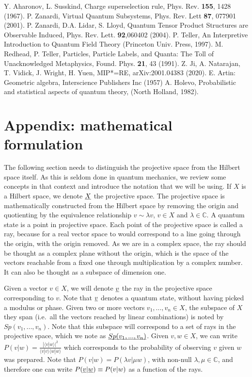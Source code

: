 \documentclass[aps,prl,amsmath,amssymb,twocolumn,nofootinbib]{revtex4}
\theoremstyle{plain}
\theoremstyle{definition}
\theoremstyle{remark}
\newcommand{\pj}[1] {\underbar{$#1$}}
\def\>{\rangle}
\def\<{\langle}
\begin{document}
\begin{references}
		Y. Aharonov, L. Susskind, Charge superselection
		rule, Phys. Rev. {\bf 155}, 1428 (1967).
		P. Zanardi, Virtual Quantum Subsystems, Phys. Rev.
		Lett {\bf 87}, 077901 (2001).
		 P. Zanardi, D.A. Lidar, S. Lloyd, Quantum
		Tensor Product Structures are Observable Induced, Phys. Rev. Lett.
		{\bf 92},060402 (2004).
		P. Teller, An Interpretive Introduction to Quantum
		Field Theory (Princeton Univ. Press, 1997).  
		M. Redhead, P. Teller, Particles, Particle Labels, and
		Quanta: The Toll of Unacknowledged Metaphysics, Found. Phys. {\bf
			21}, 43 (1991).
		Z. Ji, A. Natarajan, T. Vidick, J. Wright, H. Yuen, MIP*=RE, arXiv:2001.04383 (2020). %
		 E. Artin: Geometric algebra, Interscience Publishers Inc (1957)
		A. Holevo, Probabilistic and statistical aspects of
		quantum theory, (North Holland, 1982).
	\end{references}
	
	\baselineskip
	
	\section{Appendix: mathematical formulation}\label{app}
	\setcounter{section}{1}
	
	The following section needs to distinguish the projective space from
	the Hilbert space itself. As this is seldom done in quantum mechanics,
	we review some concepts in that context and introduce the notation
	that we will be using. If $X$ is a Hilbert space, we denote $\pj{X}$
	the projective space. The projective space is mathematically
	constructed from the Hilbert space by removing the origin and
	quotienting by the equivalence relationship $v \sim \lambda v$, $v\in
	X$ and $\lambda\in\mathbb{C}$. A quantum state is a point in
	projective space. Each point of the projective space is called a ray,
	because for a real vector space to would correspond to a line going through
	the origin, with the origin removed. As we are in a complex space, the
	ray should be thought as a complex plane without the origin, which is
	the space of the vectors reachable from a fixed one through
	multiplication by a complex number. It can also be thought as a
	subspace of dimension one.
	
	Given a vector $v \in X$, we will denote $\pj{v}$ the ray in the
	projective space corresponding to $v$. Note that $\pj{v}$ denotes a
	quantum state, without having picked a modulus or phase. Given two or
	more vectors $v_1, ..., v_n \in X$, the subspace of $X$ they span
	(i.e.~all the vectors reached by linear combinations) is noted by
	$Sp(v_1, ..., v_n)$. Note that this subspace will correspond to a set
	of rays in the projective space, which we note as $\pj{Sp(v_1, ...,
		v_n)}$. Given $v,w \in X$, we can write $P(v|w) = \frac{|\< v | w
		\>|^2}{\< v | v \>\< w | w \>}$ which corresponds to the probability
	of observing $v$ given $w$ was prepared. Note that $P(v|w) = P(\lambda
	v| \mu w)$, with non-null $\lambda,\mu\in{\mathbb C}$, and therefore
	one can write $P(\pj{v} | \pj{w})\equiv P(v|w)$ as a function of the
	rays.
	
\end{document}
